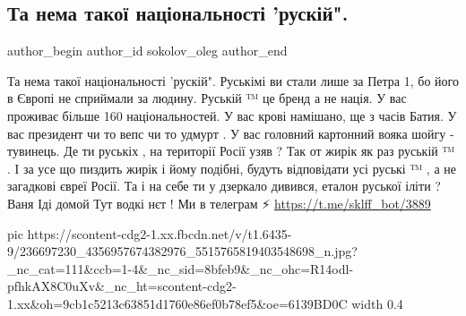  
 
 
 
 
 
\subsection{Та нема такої національності 'рускій".}
\label{sec:12_08_2021.fb.sokolov_oleg.1.russkij_nacionalnost}
 
\ifcmt
 author_begin
   author_id sokolov_oleg
 author_end
\fi

\obeycr
Та нема такої національності 'рускій".
Руськімі ви стали лише за Петра 1, бо його в Європі не сприймали за людину.
Руській ™ це бренд а не нація.
У вас проживає більше 160 національностей.
У вас крові намішано, ще з часів Батия.
У вас президент чи то вепс чи то удмурт .
У вас головний картонний вояка шойгу - тувинець.
Де ти руськіх , на території Росії узяв ?
Так от жирік як раз руській ™ .
І за усе що пиздить жирік і йому подібні, будуть відповідати усі руські ™ , а не загадкові євреї Росії.
Та і на себе ти у дзеркало дивився, еталон руської іліти ?
Ваня
Іді домой
Тут водкі нєт !
Ми в телеграм ⚡
\restorecr
\url{https://t.me/sklff_bot/3889}

\ifcmt
  pic https://scontent-cdg2-1.xx.fbcdn.net/v/t1.6435-9/236697230_4356957674382976_5515765819403548698_n.jpg?_nc_cat=111&ccb=1-4&_nc_sid=8bfeb9&_nc_ohc=R14odl-pfhkAX8C0uXv&_nc_ht=scontent-cdg2-1.xx&oh=9cb1c5213c63851d1760e86ef0b78ef5&oe=6139BD0C
  width 0.4
\fi
